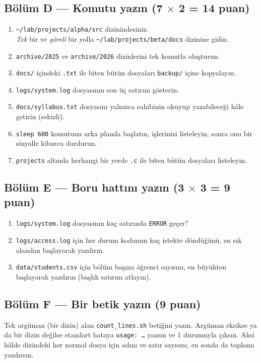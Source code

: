 \subsection*{Bölüm D --- Komutu yazın (7 $\times$ 2 = 14 puan)}
\begin{enumerate}[leftmargin=1.6em,label=D\arabic*.]
  \item \texttt{\textasciitilde/lab/projects/alpha/src} dizinindesiniz.\\ \emph{Tek} bir  ve \emph{göreli} bir yolla \texttt{\textasciitilde/lab/projects/beta/docs} dizinine gidin.
  \item \texttt{archive/2025} ve \texttt{archive/2026} dizinlerini tek komutla oluşturun.
  \item \texttt{docs/} içindeki \texttt{.txt} ile biten bütün dosyaları \texttt{backup/} içine kopyalayın.
  \item \texttt{logs/system.log} dosyasının son üç satırını gösterin.
  \item \texttt{docs/syllabus.txt} dosyasını yalnızca sahibinin okuyup yazabileceği hâle getirin (sekizli).
  \item \texttt{sleep 600} komutunu arka planda başlatın, işlerinizi listeleyin, sonra onu bir sinyalle kibarca durdurun.
  \item \texttt{projects} altında herhangi bir yerde \texttt{.c} ile biten bütün dosyaları listeleyin.
\end{enumerate}

\subsection*{Bölüm E --- Boru hattını yazın (3 $\times$ 3 = 9 puan)}
\begin{enumerate}[leftmargin=1.6em,label=E\arabic*.]
  \item \texttt{logs/system.log} dosyasının kaç satırında \texttt{ERROR} geçer?
  \item \texttt{logs/access.log} için her durum kodunun kaç istekte döndüğünü, en sık olandan başlayarak yazdırın.
  \item \texttt{data/students.csv} için bölüm başına öğrenci sayısını, en büyükten başlayarak yazdırın (başlık satırını atlayın).
\end{enumerate}

\subsection*{Bölüm F --- Bir betik yazın (9 puan)}
Tek argüman (bir dizin) alan \texttt{count\_lines.sh} betiğini yazın. Argüman eksikse ya da bir dizin değilse standart hataya \texttt{usage: \dots} yazsın ve $1$ durumuyla çıksın. Aksi hâlde dizindeki her normal dosya için adını ve satır sayısını, en sonda da toplamı yazdırsın.

